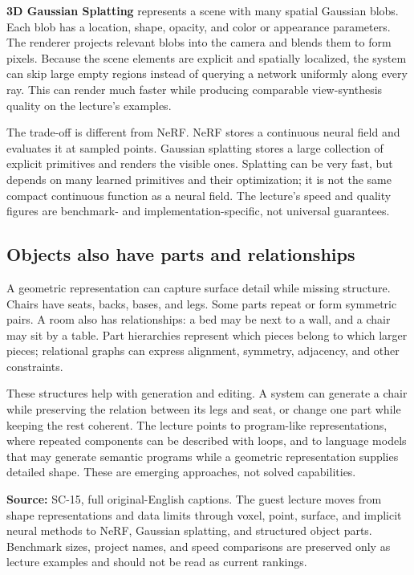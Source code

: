 \textbf{3D Gaussian Splatting} represents a scene with many spatial Gaussian blobs. Each blob has a location, shape, opacity, and color or appearance parameters. The renderer projects relevant blobs into the camera and blends them to form pixels. Because the scene elements are explicit and spatially localized, the system can skip large empty regions instead of querying a network uniformly along every ray. This can render much faster while producing comparable view-synthesis quality on the lecture's examples.

The trade-off is different from NeRF. NeRF stores a continuous neural field and evaluates it at sampled points. Gaussian splatting stores a large collection of explicit primitives and renders the visible ones. Splatting can be very fast, but depends on many learned primitives and their optimization; it is not the same compact continuous function as a neural field. The lecture's speed and quality figures are benchmark- and implementation-specific, not universal guarantees.

\subsection{Objects also have parts and relationships}\label{04-visual-computing-ii-ch034-objects-also-have-parts-and-relationships}

A geometric representation can capture surface detail while missing structure. Chairs have seats, backs, bases, and legs. Some parts repeat or form symmetric pairs. A room also has relationships: a bed may be next to a wall, and a chair may sit by a table. Part hierarchies represent which pieces belong to which larger pieces; relational graphs can express alignment, symmetry, adjacency, and other constraints.

These structures help with generation and editing. A system can generate a chair while preserving the relation between its legs and seat, or change one part while keeping the rest coherent. The lecture points to program-like representations, where repeated components can be described with loops, and to language models that may generate semantic programs while a geometric representation supplies detailed shape. These are emerging approaches, not solved capabilities.

\textbf{Source:} SC-15, full original-English captions. The guest lecture moves from shape representations and data limits through voxel, point, surface, and implicit neural methods to NeRF, Gaussian splatting, and structured object parts. Benchmark sizes, project names, and speed comparisons are preserved only as lecture examples and should not be read as current rankings.

